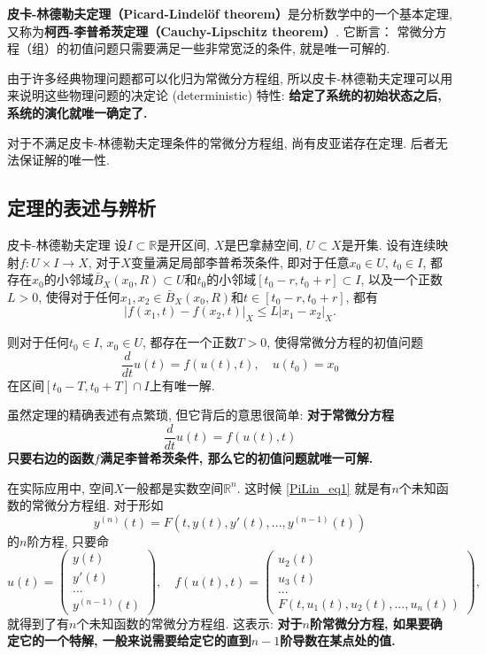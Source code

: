
\textbf{皮卡-林德勒夫定理（Picard-Lindelöf theorem）}是分析数学中的一个基本定理, 又称为\textbf{柯西-李普希茨定理（Cauchy-Lipschitz theorem）}. 它断言： 常微分方程（组）的初值问题只需要满足一些非常宽泛的条件, 就是唯一可解的. 

由于许多经典物理问题都可以化归为常微分方程组, 所以皮卡-林德勒夫定理可以用来说明这些物理问题的决定论 (deterministic) 特性: \textbf{给定了系统的初始状态之后, 系统的演化就唯一确定了.}

对于不满足皮卡-林德勒夫定理条件的常微分方程组, 尚有皮亚诺存在定理. 后者无法保证解的唯一性.

\subsection{定理的表述与辨析}
\begin{theorem}{皮卡-林德勒夫定理}
设$I\subset\mathbb{R}$是开区间, $X$是巴拿赫空间, $U\subset X$是开集. 设有连续映射$f:U\times I\to X$, 对于$X$变量满足局部李普希茨条件, 即对于任意$x_0\in U$, $t_0\in I$, 都存在$x_0$的小邻域$\bar B_X(x_0,R)\subset U$和$t_0$的小邻域$[t_0-r,t_0+r]\subset I$, 以及一个正数$L>0$, 使得对于任何$x_1,x_2\in \bar B_X(x_0,R)$和$t\in[t_0-r,t_0+r]$, 都有
$$
|f(x_1,t)-f(x_2,t)|_X\leq L|x_1-x_2|_X.
$$

则对于任何$t_0\in I$, $x_0\in U$, 都存在一个正数$T>0$, 使得常微分方程的初值问题
$$
\frac{d}{dt}u(t)=f(u(t),t),\quad u(t_0)=x_0
$$
在区间$[t_0-T,t_0+T]\cap I$上有唯一解.
\end{theorem}

虽然定理的精确表述有点繁琐, 但它背后的意思很简单: \textbf{对于常微分方程}
\begin{equation}\label{PiLin_eq1}
\frac{d}{dt}u(t)=f(u(t),t)
\end{equation}
\textbf{只要右边的函数$f$满足李普希茨条件, 那么它的初值问题就唯一可解.}

在实际应用中, 空间$X$一般都是实数空间$\mathbb{R}^n$. 这时候 \autoref{PiLin_eq1} 就是有$n$个未知函数的常微分方程组. 对于形如
$$
y^{(n)}(t)=F(t,y(t),y'(t),...,y^{(n-1)}(t))
$$
的$n$阶方程, 只要命
$$
u(t)=\left(\begin{array}{c}
y(t)\\
y'(t)\\
...\\
y^{(n-1)}(t)
\end{array}
\right),\quad
f(u(t),t)=\left(\begin{array}{c}
u_2(t)\\
u_3(t)\\
...\\
F\left(t,u_1(t),u_2(t),...,u_n(t)\right)
\end{array}
\right),
$$
就得到了有$n$个未知函数的常微分方程组. 这表示: \textbf{对于$n$阶常微分方程, 如果要确定它的一个特解, 一般来说需要给定它的直到$n-1$阶导数在某点处的值.}


